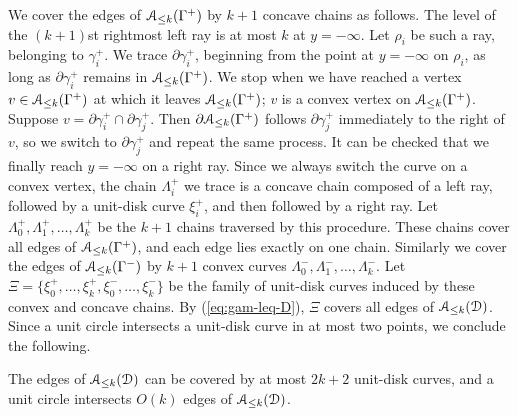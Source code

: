 \documentclass[11pt]{myclass}
\newcommand{\EuD}{\ensuremath{\EuScript{D}}}
\newcommand{\EuA}{\ensuremath{\EuScript{A}}}
\begin{document}
We cover the edges of $\EuA_{\leq k}(\Gamma^+)$ by $k+1$ concave chains as follows.  The level of the $(k+1)$st rightmost left ray is at most $k$ at $y=-\infty$.  Let $\rho_i$ be such a ray, belonging to $\gamma_i^+$.  We trace $\partial \gamma_i^+$, beginning from the point at $y=-\infty$ on $\rho_i$, as long as $\partial \gamma_i^+$ remains in $\EuA_{\leq k}(\Gamma^+)$.  We stop when we have reached a vertex $v \in \EuA_{\leq k}(\Gamma^+)$ at which it leaves $\EuA_{\leq k}(\Gamma^+)$; $v$ is a convex vertex on $\EuA_{\leq k}(\Gamma^+)$.  Suppose $v = \partial \gamma_i^+ \cap \partial \gamma_j^+$.  Then $\partial \EuA_{\leq k}(\Gamma^+)$ follows $\partial \gamma_j^+$ immediately to the right of $v$, so we switch to $\partial \gamma_j^+$ and repeat the same process.  It can be checked that we finally reach $y=-\infty$ on a right ray.  Since we always switch the curve on a convex vertex, the chain $\Lambda_i^+$ we trace is a concave chain composed of a left ray, followed by a unit-disk curve $\xi_i^+$, and then followed by a right ray.  Let $\Lambda_0^+, \Lambda_1^+, \ldots, \Lambda_k^+$ be the $k+1$ chains traversed by this procedure.  These chains cover all edges of $\EuA_{\leq k}(\Gamma^+)$, and each edge lies exactly on one chain.  Similarly we cover the edges of $\EuA_{\leq k}(\Gamma^-)$ by $k+1$ convex curves $\Lambda_0^-, \Lambda_1^-, \ldots, \Lambda_k^-$.  Let $\Xi = \{\xi_0^+, \ldots, \xi_k^+, \xi_0^-, \ldots, \xi_k^-\}$ be the family of unit-disk curves induced by these convex and concave chains.  By (\ref{eq:gam-leq-D}), $\Xi$ covers all edges of $\EuA_{\leq k}(\EuD)$.  
Since a unit circle intersects a unit-disk curve in at most two points, we conclude the following.

\begin{lemma}
The edges of $\EuA_{\leq k}(\EuD)$ can be covered by at most $2k+2$ unit-disk curves, and a unit circle intersects $O(k)$ edges of $\EuA_{\leq k}(\EuD)$.  
\label{lem:k-udc}
\end{lemma}
\end{document}
